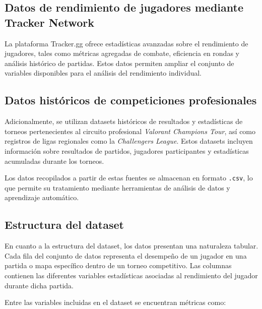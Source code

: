 \documentclass{ULBreport} %
\begin{document}
\subsection*{Datos de rendimiento de jugadores mediante Tracker Network}

La plataforma Tracker.gg ofrece estadísticas avanzadas sobre el rendimiento de jugadores, tales como métricas agregadas de combate, eficiencia en rondas y análisis histórico de partidas. Estos datos permiten ampliar el conjunto de variables disponibles para el análisis del rendimiento individual.

\subsection*{Datos históricos de competiciones profesionales}

Adicionalmente, se utilizan datasets históricos de resultados y estadísticas de torneos pertenecientes al circuito profesional \textit{Valorant Champions Tour}, así como registros de ligas regionales como la \textit{Challengers League}. Estos datasets incluyen información sobre resultados de partidos, jugadores participantes y estadísticas acumuladas durante los torneos.

Los datos recopilados a partir de estas fuentes se almacenan en formato \texttt{.csv}, lo que permite su tratamiento mediante herramientas de análisis de datos y aprendizaje automático.

\subsection{Estructura del dataset}

En cuanto a la estructura del dataset, los datos presentan una naturaleza tabular. Cada fila del conjunto de datos representa el desempeño de un jugador en una partida o mapa específico dentro de un torneo competitivo. Las columnas contienen las diferentes variables estadísticas asociadas al rendimiento del jugador durante dicha partida.

Entre las variables incluidas en el dataset se encuentran métricas como:
\end{document}
